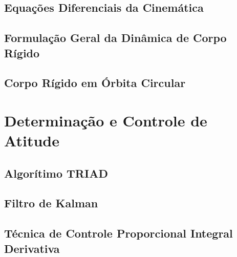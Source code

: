 \subsection{Equações Diferenciais da Cinemática}
\subsection{Formulação Geral da Dinâmica de Corpo Rígido}
\subsection{Corpo Rígido em Órbita Circular}

\section{Determinação e Controle de Atitude}
\subsection{Algorítimo TRIAD}
\subsection{Filtro de Kalman}
\subsection{Técnica de Controle Proporcional Integral Derivativa}
